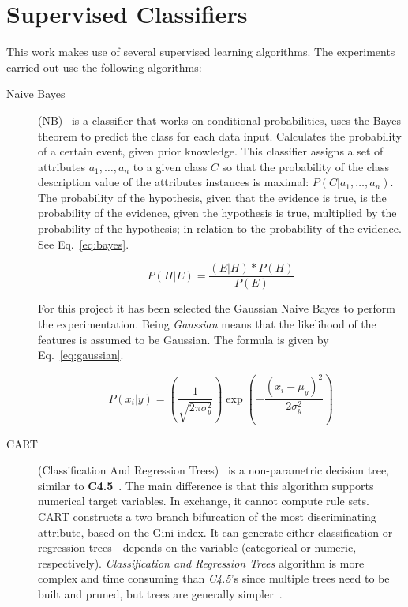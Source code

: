 \section{Supervised Classifiers}

This work makes use of several supervised learning algorithms. The 
experiments carried out use the following algorithms:

\begin{description}
    \item [Naive Bayes] (NB)~\cite{Mit97} is a classifier that works on 
    conditional probabilities, uses the Bayes theorem to predict the class for 
    each data input. Calculates the probability of a certain event, given prior 
    knowledge. This classifier assigns a set of attributes 
    $a_{1}, \ldots, a_{n}$ to a given class $C$ so that the probability of the 
    class description value of the attributes instances is maximal: 
    $P(C|a_{1}, \ldots, a_n)$. The probability of the hypothesis, given that 
    the evidence is true, is the probability of the evidence, given the 
    hypothesis is true, multiplied by the probability of the hypothesis; in 
    relation to the probability of the evidence. See Eq.~\ref{eq:bayes}.
    
    \begin{equation}\label{eq:bayes}
        P(H|E) = \frac{(E|H) * P(H)}{P(E)}
    \end{equation}
    
    For this project it has been selected the Gaussian Naive Bayes to perform
    the experimentation. Being \textit{Gaussian} means that the likelihood of
    the features is assumed to be Gaussian. The formula is given by 
    Eq.~\ref{eq:gaussian}.
    
    \begin{equation}\label{eq:gaussian}
        P(x_{i}|y)=(\frac{1}{\sqrt{2\pi \sigma^{2}_{y}}})\exp{(-\frac{(x_{i} - \mu _{y})^2}{2\sigma^{2}_{y}})}
    \end{equation}
    
    \item [CART] (Classification And Regression Trees)~\cite{Breiman1984} is a 
    non-parametric decision tree, similar to \textbf{C4.5}~\cite{Quinlan1993}. 
    The main difference is that this algorithm supports numerical target 
    variables. In exchange, it cannot compute rule sets. CART constructs a two 
    branch bifurcation of the most discriminating attribute, based on the
    Gini index. It can generate either classification or regression trees - 
    depends on the variable (categorical or numeric, respectively). 
    \textit{Classification and Regression Trees} algorithm is more complex and 
    time consuming than \textit{C4.5}'s since multiple trees need to be built 
    and pruned, but trees are generally simpler~\cite{oates1997}.
    

\end{description}
